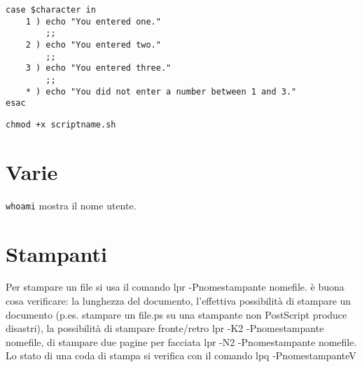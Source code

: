 \documentclass{article}
\begin{document}
\begin{lstlisting}
case $character in
    1 ) echo "You entered one."
        ;;
    2 ) echo "You entered two."
        ;;
    3 ) echo "You entered three."
        ;;
    * ) echo "You did not enter a number between 1 and 3."
esac
\end{lstlisting}
\texttt{chmod +x scriptname.sh}


\section{Varie}
\texttt{whoami} mostra il nome utente. \newline





\section{Stampanti}
Per stampare un file si usa il comando lpr -Pnomestampante nomefile.
è buona cosa verificare: la lunghezza del documento, l'effettiva possibilità di stampare un documento (p.es. stampare un file.ps su una stampante non PostScript produce disastri), la possibilità di stampare fronte/retro lpr -K2 -Pnomestampante nomefile,
di stampare due pagine per facciata lpr -N2 -Pnomestampante nomefile.
Lo stato di una coda di stampa si verifica con il comando lpq -PnomestampanteV
\end{document}
